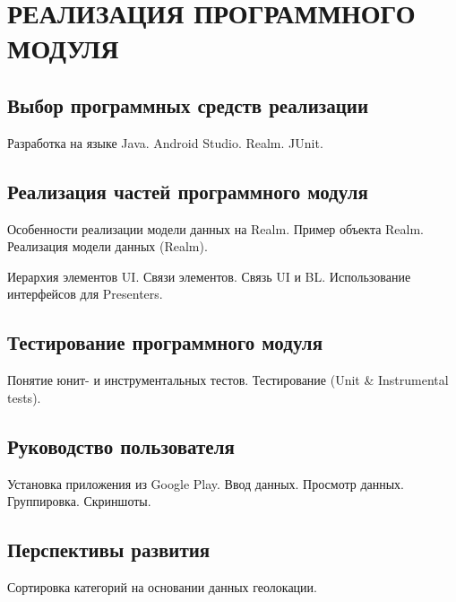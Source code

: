 \section[Реализация программного модуля]{%
  РЕАЛИЗАЦИЯ ПРОГРАММНОГО МОДУЛЯ
}\label{sec:implementation}

\subsection{Выбор программных средств реализации}

Разработка на языке Java. Android Studio.
Realm. JUnit.

\subsection{Реализация частей программного модуля}

Особенности реализации модели данных на Realm.
Пример объекта Realm.
Реализация  модели данных (Realm).

Иерархия элементов UI. Связи элементов.
Связь UI и BL. Использование интерфейсов для Presenters.


\subsection{Тестирование  программного модуля}

Понятие юнит- и инструментальных тестов.
Тестирование (Unit \& Instrumental tests).

\subsection{Руководство пользователя}

Установка приложения из Google Play.
Ввод данных. Просмотр данных. Группировка.
Скриншоты.

\subsection{Перспективы развития}

Сортировка категорий на основании данных геолокации.

